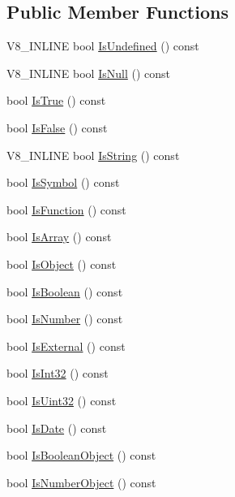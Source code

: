 \subsection*{Public Member Functions}
\begin{DoxyCompactItemize}
\item 
V8\-\_\-\-I\-N\-L\-I\-N\-E bool \hyperlink{classv8_1_1Value_aea287b745656baa8a12a2ae1d69744b6}{Is\-Undefined} () const 
\item 
V8\-\_\-\-I\-N\-L\-I\-N\-E bool \hyperlink{classv8_1_1Value_aa2c6ed8ef832223a7e2cd81e6ac61c78}{Is\-Null} () const 
\item 
bool \hyperlink{classv8_1_1Value_a8f27462322186b295195eecb3e81d6d7}{Is\-True} () const 
\item 
bool \hyperlink{classv8_1_1Value_a68c0296071d01ca899825d7643cf495a}{Is\-False} () const 
\item 
V8\-\_\-\-I\-N\-L\-I\-N\-E bool \hyperlink{classv8_1_1Value_ab23a34b7df62806808e01b0908bf5f00}{Is\-String} () const 
\item 
bool \hyperlink{classv8_1_1Value_af3e6081c22d09a7bbc0a2aff59ed60a5}{Is\-Symbol} () const 
\item 
bool \hyperlink{classv8_1_1Value_a05532a34cdd215f273163830ed8b77e7}{Is\-Function} () const 
\item 
bool \hyperlink{classv8_1_1Value_aaee0b144087d20eae02314c9393ff80f}{Is\-Array} () const 
\item 
bool \hyperlink{classv8_1_1Value_a355b7991c5c978c0341f6f961b63c5a2}{Is\-Object} () const 
\item 
bool \hyperlink{classv8_1_1Value_a0aceb7645e71b096df5cd73d1252b1b0}{Is\-Boolean} () const 
\item 
bool \hyperlink{classv8_1_1Value_a1bd51e3e55f67c65b9a8f587fbffb7c7}{Is\-Number} () const 
\item 
bool \hyperlink{classv8_1_1Value_a7ac61a325c18af8dcb6d7d5bf47d2503}{Is\-External} () const 
\item 
bool \hyperlink{classv8_1_1Value_a01e1db51c65b2feace248b7acbf71a2c}{Is\-Int32} () const 
\item 
bool \hyperlink{classv8_1_1Value_a783c89631bac4ef3c4b909f40cc2b8d8}{Is\-Uint32} () const 
\item 
bool \hyperlink{classv8_1_1Value_a8bc11fab0aded4a805722ab6df173cae}{Is\-Date} () const 
\item 
bool \hyperlink{classv8_1_1Value_abe7bc06283e5e66013f2f056a943168b}{Is\-Boolean\-Object} () const 
\item 
bool \hyperlink{classv8_1_1Value_a5f4aa9504a6d8fc3af9489330179fe14}{Is\-Number\-Object} () const 

\end{DoxyCompactItemize}
